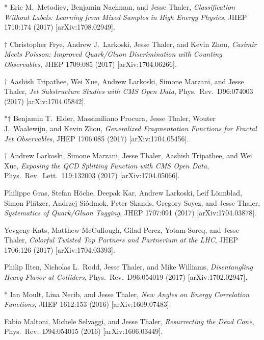 \begin{list}{[]\addtocounter{jessecount}{-1}}{\leftmargin=3em \itemsep=4pt}
\item
* Eric M.\ Metodiev, Benjamin Nachman, and Jesse Thaler,
\emph{Classification Without Labels: Learning from Mixed Samples in High Energy Physics},
JHEP 1710:174 (2017)
[arXiv:1708.02949].

\item
$\dagger$ Christopher Frye, Andrew J.\ Larkoski, Jesse Thaler, and Kevin Zhou,
\emph{Casimir Meets Poisson: Improved Quark/Gluon Discrimination with Counting Observables},
JHEP 1709:085 (2017)
[arXiv:1704.06266].

\item
$\dagger$ Aashish Tripathee, Wei Xue, Andrew Larkoski, Simone Marzani, and Jesse Thaler,
\emph{Jet Substructure Studies with CMS Open Data},
Phys.\ Rev.\ D96:074003 (2017)
[arXiv:1704.05842].

\item
*$\dagger$ Benjamin T.\ Elder, Massimiliano Procura, Jesse Thaler, Wouter J.\ Waalewijn, and Kevin Zhou,
\emph{Generalized Fragmentation Functions for Fractal Jet Observables},
JHEP 1706:085 (2017)
[arXiv:1704.05456].

\item
$\dagger$ Andrew Larkoski, Simone Marzani, Jesse Thaler, Aashish Tripathee, and Wei Xue,
\emph{Exposing the QCD Splitting Function with CMS Open Data},
Phys.\ Rev.\ Lett.\ 119:132003 (2017)
[arXiv:1704.05066].

\item
 Philippe Gras, Stefan Höche, Deepak Kar, Andrew Larkoski, Leif Lönnblad, Simon Plätzer, Andrzej Siódmok, Peter Skands, Gregory Soyez, and Jesse Thaler,
\emph{Systematics of Quark/Gluon Tagging},
JHEP 1707:091 (2017)
[arXiv:1704.03878].

\item
 Yevgeny Kats, Matthew McCullough, Gilad Perez, Yotam Soreq, and Jesse Thaler,
\emph{Colorful Twisted Top Partners and Partnerium at the LHC},
JHEP 1706:126 (2017)
[arXiv:1704.03393].

\item
 Philip Ilten, Nicholas L.\ Rodd, Jesse Thaler, and Mike Williams,
\emph{Disentangling Heavy Flavor at Colliders},
Phys.\ Rev.\ D96:054019 (2017)
[arXiv:1702.02947].

\item
* Ian Moult, Lina Necib, and Jesse Thaler,
\emph{New Angles on Energy Correlation Functions},
JHEP 1612:153 (2016)
[arXiv:1609.07483].

\item
 Fabio Maltoni, Michele Selvaggi, and Jesse Thaler,
\emph{Resurrecting the Dead Cone},
Phys.\ Rev.\ D94:054015 (2016)
[arXiv:1606.03449].


\end{list}
